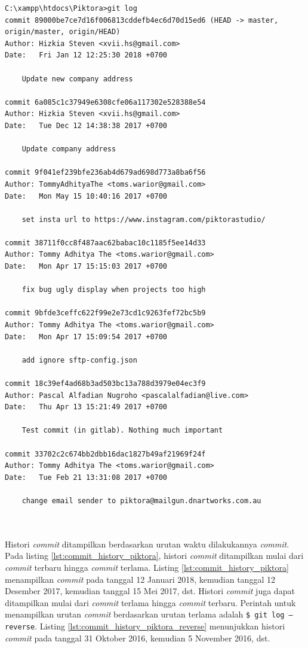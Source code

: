 \begin{lstlisting}[caption={Histori \textit{commit} pada proyek Piktora},label={lst:commit_history_piktora},language=plaintext]
C:\xampp\htdocs\Piktora>git log
commit 89000be7ce7d16f006813cddefb4ec6d70d15ed6 (HEAD -> master, origin/master, origin/HEAD)
Author: Hizkia Steven <xvii.hs@gmail.com>
Date:   Fri Jan 12 12:25:30 2018 +0700

    Update new company address

commit 6a085c1c37949e6308cfe06a117302e528388e54
Author: Hizkia Steven <xvii.hs@gmail.com>
Date:   Tue Dec 12 14:38:38 2017 +0700

    Update company address

commit 9f041ef239bfe236ab4d679ad698d773a8ba6f56
Author: TommyAdhityaThe <toms.warior@gmail.com>
Date:   Mon May 15 10:40:16 2017 +0700

    set insta url to https://www.instagram.com/piktorastudio/

commit 38711f0cc8f487aac62babac10c1185f5ee14d33
Author: Tommy Adhitya The <toms.warior@gmail.com>
Date:   Mon Apr 17 15:15:03 2017 +0700

    fix bug ugly display when projects too high

commit 9bfde3ceffc622f99e2e73cd1c9263fef72bc5b9
Author: Tommy Adhitya The <toms.warior@gmail.com>
Date:   Mon Apr 17 15:09:54 2017 +0700

    add ignore sftp-config.json

commit 18c39ef4ad68b3ad503bc13a788d3979e04ec3f9
Author: Pascal Alfadian Nugroho <pascalalfadian@live.com>
Date:   Thu Apr 13 15:21:49 2017 +0700

    Test commit (in gitlab). Nothing much important

commit 33702c2c674bb2dbb16dac1827b49af21969f24f
Author: Tommy Adhitya The <toms.warior@gmail.com>
Date:   Tue Feb 21 13:31:08 2017 +0700

    change email sender to piktora@mailgun.dnartworks.com.au
    
\end{lstlisting}
\ \\

Histori \textit{commit} ditampilkan berdasarkan urutan waktu dilakukannya \textit{commit}. Pada listing \ref{lst:commit_history_piktora}, histori \textit{commit} ditampilkan mulai dari \textit{commit} terbaru hingga \textit{commit} terlama. Listing \ref{lst:commit_history_piktora} menampilkan \textit{commit} pada tanggal 12 Januari 2018, kemudian tanggal 12 Desember 2017, kemudian tanggal 15 Mei 2017, dst. Histori \textit{commit} juga dapat ditampilkan mulai dari \textit{commit} terlama hingga \textit{commit} terbaru. Perintah untuk menampilkan urutan \textit{commit} berdasarkan urutan terlama adalah \texttt{\$ git log --reverse}. Listing \ref{lst:commit_history_piktora_reverse} menunjukkan histori \textit{commit} pada tanggal 31 Oktober 2016, kemudian 5 November 2016, dst. 

